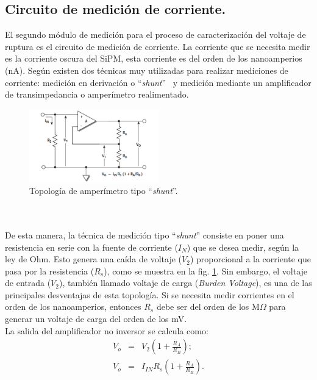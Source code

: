 \subsection{Circuito de medición de corriente.}
El segundo módulo de medición para el proceso de caracterización del voltaje de ruptura es el circuito de medición de corriente. La corriente que se necesita medir es la corriente oscura del  SiPM, esta corriente es del orden de los nanoamperios (nA). Según \citep{low_level} existen dos técnicas muy utilizadas para realizar mediciones de corriente: medición en derivación o ``\textit{shunt}'' ~y medición mediante un amplificador de transimpedancia o amperímetro realimentado.
\begin{figure}[h!]
\begin{centering}
  \includegraphics[width=0.5\textwidth]{Images/Shunt.png}
    \caption{Topología de amperímetro tipo ``\textit{shunt}''. }
    \label{fig:shunt_circuit}
  \par\end{centering}
\end{figure}
\\ \\
De esta manera, la técnica de medición tipo ``\textit{shunt}'' consiste en poner una resistencia en serie con la fuente de corriente ($I_N$) que se desea medir, según la ley de Ohm. Esto genera una caída de voltaje ($V_2$) proporcional a la corriente que pasa por la resistencia ($R_s$), como se muestra en la fig. \ref{fig:shunt_circuit}. Sin embargo, el voltaje de entrada ($V_2$), también llamado voltaje de carga (\textit{Burden Voltage}), es una de las principales desventajas de esta topología. Si se necesita medir corrientes en el orden de los nanoamperios, entonces $R_s$ debe ser del orden de los M$\Omega$ para generar un voltaje de carga del orden de los mV.\\
La salida del amplificador no inversor se calcula como: 
\begin{eqnarray}
    V_o &=& V_2\left(1+\frac{R_A}{R_B}\right);\\
     V_o &=& I_{IN}R_s\left(1+\frac{R_A}{R_B}\right).
\end{eqnarray}
